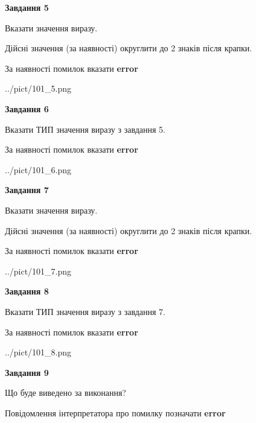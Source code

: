 \documentclass[11pt, ukrainian]{article}
\begin{document}
{\begin {large}
{\begin {center}\textbf{Завдання 5}\end {center}}\par
Вказати значення виразу. \par
Дійсні значення (за наявності) округлити до 2 знаків після крапки. \par
За наявності помилок вказати \textbf{error}

\begin{center}
	{../pict/101_5.png}
\end{center}
\newpage

{\begin {center}\textbf{Завдання 6}\end {center}}\par
Вказати ТИП значення виразу з завдання 5. \par
За наявності помилок вказати \textbf{error}

\begin{center}
	{../pict/101_6.png}
\end{center}
\newpage

{\begin {center}\textbf{Завдання 7}\end {center}}\par
Вказати значення виразу. \par
Дійсні значення (за наявності) округлити до 2 знаків після крапки. \par
За наявності помилок вказати \textbf{error}

\begin{center}
	{../pict/101_7.png}
\end{center}
\newpage

{\begin {center}\textbf{Завдання 8}\end {center}}\par
Вказати ТИП значення виразу з завдання 7. \par
За наявності помилок вказати \textbf{error}

\begin{center}
	{../pict/101_8.png}
\end{center}
\newpage

{\begin {center}\textbf{Завдання 9}\end {center}}\par
Що буде виведено за виконання? \par
Повідомлення інтерпретатора про помилку позначати \textbf{error}


\end{large}}
\end{document}
